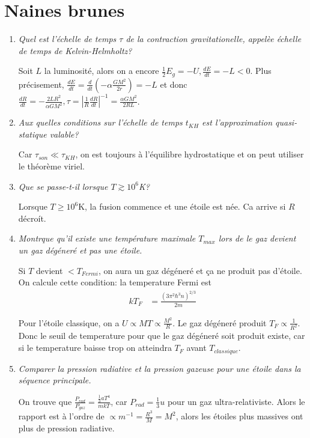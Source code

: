 \documentclass[10pt]{report}
\newcommand{\rd}[2]{\frac{d#1}{d#2}}
\newcommand{\abs}[1]{\left|#1\right|}
\begin{document}
\section{Naines brunes}

\begin{enumerate}[1.]
    \item \emph{Quel est l'\'echelle de temps $\tau$ de la contraction gravitationelle, appel\`ee \'echelle de temps de Kelvin-Helmholtz?}

        Soit $L$ la luminosit\'e, alors on a encore $\frac{1}{2}E_g = -U, \rd{E}{t} = -L < 0$. Plus pr\'ecisement, $\rd{E}{t} = \rd{}{t}\left( -\alpha \frac{GM^2}{2r} \right) = -L$ et donc $\rd{R}{t} = -\frac{2LR^2}{\alpha GM^2}, \tau = \abs{\frac{1}{R}\rd{R}{t}}^{-1} = \frac{\alpha GM^2}{2RL}$. 

    \item \emph{Aux quelles conditions sur l'\'echelle de temps $t_{KH}$ est l'approximation quasi-statique valable?}

        Car $\tau_{son} \ll \tau_{KH}$, on est toujours \`a l'\'equilibre hydrostatique et on peut utiliser le th\'eor\`eme viriel.

    \item \emph{Que se passe-t-il lorsque $T \gtrsim 10^6$K?}

        Lorsque $T \geq 10^6$K, la fusion commence et une \'etoile est n\'ee. Ca arrive si $R$ d\'ecro\'it.

    \item \emph{Montrque qu'il existe une temp\'erature maximale $T_{max}$ lors de le gaz devient un gaz d\'eg\'ener\'e et pas une \'etoile.}

        Si $T$ devient $<T_{Fermi}$, on aura un gaz d\'eg\'ener\'e et \c{c}a ne produit pas d'\'etoile. On calcule cette condition: la temperature Fermi est
        \begin{align}
            kT_F &= \frac{\left( 3\pi ^2 \hbar^3 n \right)^{2/3}}{2m}
        \end{align}

        Pour l'\'etoile classique, on a $U \propto MT \propto \frac{M^2}{R}$. Le gaz d\'eg\'ener\'e produit $T_F \propto \frac{1}{R^2}$. Donc le seuil de temperature pour que le gaz d\'eg\'ener\'e soit produit existe, car si le temperature baisse trop on atteindra $T_F$ avant $T_{classique}$.

    \item \emph{Comparer la pression radiative et la pression gazeuse pour une \'etoile dans la s\'equence principale.}

        On trouve que $\frac{P_{rad}}{P_{gaz}} = \frac{\frac{1}{3}aT^4}{mkT}$, car $P_{rad} = \frac{1}{3}u$ pour un gaz ultra-relativiste. Alors le rapport est \`a l'ordre de $\propto m^{-1} = \frac{R^3}{M} = M^2$, alors les \'etoiles plus massives ont plus de pression radiative.
\end{enumerate}
\end{document}
